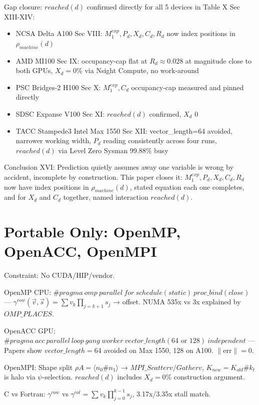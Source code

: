 \documentclass[11pt,a4paper]{article}
\begin{document}
Gap closure: $reached(d)$ confirmed directly for all 5 devices in Table X Sec XIII-XIV:
\begin{itemize}
\item NCSA Delta A100 Sec VIII: $M_1^{exp},P_d,X_d,C_d,R_d$ now index positions in $\rho_{machine}(d)$
\item AMD MI100 Sec IX: occupancy-cap flat at $R_d\approx0.028$ at magnitude close to both GPUs, $X_d=0\%$ via Nsight Compute, no work-around
\item PSC Bridges-2 H100 Sec X: $M_1^{exp},C_d$ occupancy-cap measured and pinned directly
\item SDSC Expanse V100 Sec XI: $reached(d)$ confirmed, $X_d$ 0%
\item TACC Stampede3 Intel Max 1550 Sec XII: vector\_length=64 avoided, narrower working width, $P_d$ reading consistently across four runs, $reached(d)$ via Level Zero Sysman 99.88\% busy
\end{itemize}

Conclusion XVI: Prediction quietly assumes away one variable is wrong by accident, incomplete by construction. This paper closes it: $M_1^{exp},P_d,X_d,C_d,R_d$ now have index positions in $\rho_{machine}(d)$, stated equation each one completes, and for $X_d$ and $C_d$ together, named interaction $reached(d)$.

\section{Portable Only: OpenMP, OpenACC, OpenMPI}

Constraint: No CUDA/HIP/vendor.

OpenMP CPU: $\#pragma\ omp\ parallel\ for\ schedule(static)\ proc\_bind(close)$ — $\gamma^{row}(\vec v,\vec s)=\sum v_k\prod_{j=k+1}s_j$ → offset. NUMA 535x vs 3x explained by $OMP\_PLACES$.

OpenACC GPU: $\#pragma\ acc\ parallel\ loop\ gang\ worker\ vector\_length(64\text{ or }128)\ independent$ — Papers show $vector\_length=64$ avoided on Max 1550, 128 on A100. $\|\text{err}\|=0$.

OpenMPI: Shape split $\rho A=\langle n_0\#n_1\rangle$ → $MPI\_Scatterv/Gatherv$, $K_{new}=K_{old}\#k_t$ is halo via $\psi$-selection. $reached(d)$ includes $X_d=0\%$ construction argument.

C vs Fortran: $\gamma^{row}$ vs $\gamma^{col}=\sum v_k\prod_{j=0}^{k-1}s_j$, 3.17x/3.35x stall match.
\end{document}
